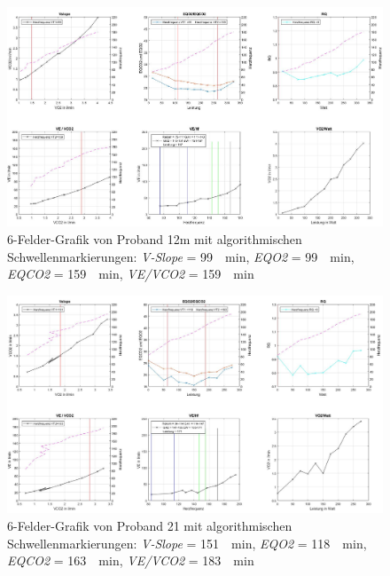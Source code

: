 %
\begin{figure}[H]
	\centering
	\noindent\includegraphics[angle=0,width=\linewidth,keepaspectratio]{Bilder/auto_12}
	\caption[6-Felder-Grafik von Proband 12m mit algorithmischen Schwellenmarkierungen]{6-Felder-Grafik von Proband 12m mit algorithmischen Schwellenmarkierungen: \textsl{V-Slope} = \SI{99}{\per\minute}, \textsl{\acs{EQO2}} = \SI{99}{\per\minute}, \textsl{\acs{EQCO2}} = \SI{159}{\per\minute}, \textsl{\acs{VE}/\acs{VCO2}} = \SI{159}{\per\minute}}
	\label{pic:pic20}
\end{figure}
%
\begin{figure}[H]
	\centering
	\noindent\includegraphics[angle=0,width=\linewidth,keepaspectratio]{Bilder/auto_21}
	\caption[6-Felder-Grafik von Proband 21 mit algorithmischen Schwellenmarkierungen]{6-Felder-Grafik von Proband 21 mit algorithmischen Schwellenmarkierungen: \textsl{V-Slope} = \SI{151}{\per\minute}, \textsl{\acs{EQO2}} = \SI{118}{\per\minute}, \textsl{\acs{EQCO2}} = \SI{163}{\per\minute}, \textsl{\acs{VE}/\acs{VCO2}} = \SI{183}{\per\minute}}
	\label{pic:pic21}
\end{figure}
